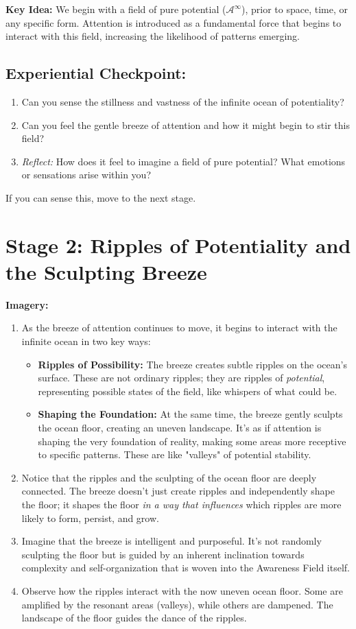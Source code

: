 \documentclass[12pt,a4paper]{article}
\begin{document}
\textbf{Key Idea:} We begin with a field of pure potential (\(\mathscr{A}^\infty\)), prior to space, time, or any specific form. Attention is introduced as a fundamental force that begins to interact with this field, increasing the likelihood of patterns emerging.

\subsection*{Experiential Checkpoint:}
\begin{enumerate}
    \item Can you sense the stillness and vastness of the infinite ocean of potentiality?
    \item Can you feel the gentle breeze of attention and how it might begin to stir this field?
    \item \textit{Reflect:} How does it feel to imagine a field of pure potential? What emotions or sensations arise within you?
\end{enumerate}

If you can sense this, move to the next stage.

\section*{Stage 2: Ripples of Potentiality and the Sculpting Breeze}

\textbf{Imagery:}
\begin{enumerate}
    \item As the breeze of attention continues to move, it begins to interact with the infinite ocean in two key ways:
    \begin{itemize}
        \item \textbf{Ripples of Possibility:} The breeze creates subtle ripples on the ocean's surface. These are not ordinary ripples; they are ripples of \textit{potential}, representing possible states of the field, like whispers of what could be.
        \item \textbf{Shaping the Foundation:} At the same time, the breeze gently sculpts the ocean floor, creating an uneven landscape. It's as if attention is shaping the very foundation of reality, making some areas more receptive to specific patterns. These are like "valleys" of potential stability.
    \end{itemize}
    \item Notice that the ripples and the sculpting of the ocean floor are deeply connected. The breeze doesn't just create ripples and independently shape the floor; it shapes the floor \textit{in a way that influences} which ripples are more likely to form, persist, and grow.
    \item Imagine that the breeze is intelligent and purposeful. It's not randomly sculpting the floor but is guided by an inherent inclination towards complexity and self-organization that is woven into the Awareness Field itself.
    \item Observe how the ripples interact with the now uneven ocean floor. Some are amplified by the resonant areas (valleys), while others are dampened. The landscape of the floor guides the dance of the ripples.
\end{enumerate}
\end{document}
